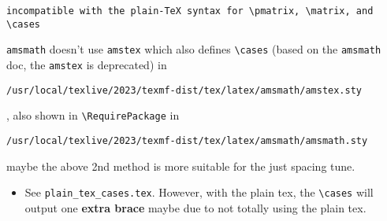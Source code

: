 \documentclass{article}
\begin{document}
\begin{enumerate}
\begin{itemize}
\begin{lstlisting}
incompatible with the plain-TeX syntax for \pmatrix, \matrix, and \cases
\end{lstlisting}
                    \verb|amsmath| doesn't use \verb|amstex| which also defines \verb|\cases| (based on the \verb|amsmath| doc, the \verb|amstex| is deprecated) in \begin{lstlisting}
/usr/local/texlive/2023/texmf-dist/tex/latex/amsmath/amstex.sty
\end{lstlisting}
                    \verb||, also shown in \verb|\RequirePackage| in
                    \begin{lstlisting}
/usr/local/texlive/2023/texmf-dist/tex/latex/amsmath/amsmath.sty
\end{lstlisting}

                    maybe the above 2nd method is more suitable for the just spacing tune.
                    \begin{itemize}
                        \item See \verb|plain_tex_cases.tex|. However, with the plain tex, the \verb|\cases| will output one \textbf{extra brace} maybe due to not totally using the plain tex.


\end{itemize}
\end{itemize}
\end{enumerate}
\end{document}
